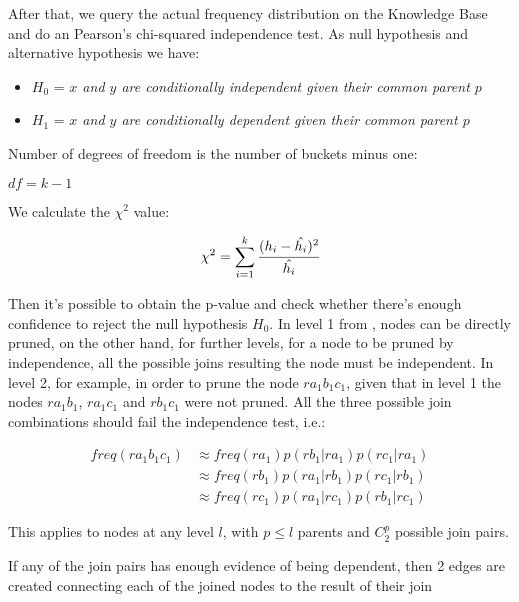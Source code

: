 After that, we query the actual frequency distribution on the Knowledge Base and do an Pearson's chi-squared
independence test. As null hypothesis and alternative hypothesis we have:

\begin{itemize}
 \item $H_0$ = \emph{$x$ and $y$ are conditionally independent given their common parent $p$}
 \item $H_1$ = \emph{$x$ and $y$ are conditionally dependent given their common parent $p$} 
\end{itemize}

  

Number of degrees of freedom is the number of buckets minus one:

\begin{center}
 $df=k-1$
\end{center}

We calculate the $\chi^2$ value:

\begin{equation}
 \chi^2=\sum_{i=1}^{k} \cfrac{(h_i - \hat{h_i})^2}{\hat{h_i}}
\end{equation}

\cite{Jaroszewicz02pruningredundant}

Then it's possible to obtain the p-value and check whether there's enough confidence to reject the null hypothesis
$H_0$. In level 1 from \graphname, nodes can be directly pruned, on the other hand, for further levels, for a node to be
pruned by independence, all the possible joins resulting the node must be independent. In level 2, for example, in order
to prune the node $r a_1 b_1 c_1$, given that in level 1 the nodes $r a_1 b_1$, $r a_1 c_1$ and $r b_1 c_1$ were not
pruned. All the three possible join combinations should fail the independence test, i.e.:

\begin{equation}
\begin{split} 
  freq(r a_1 b_1 c_1) &\approx freq(r a_1)p (r b_1|r a_1) p(r c_1|r a_1) \\ 
  &\approx  freq(r b_1) p(r a_1|r b_1) p(r c_1|r b_1) \\ 
  &\approx  freq(r c_1) p(r a_1|r c_1) p(r b_1|r c_1)  
\end{split}
\end{equation}

This applies to nodes at any level $l$, with $p \leq l$ parents and $C_{2}^{p}$ possible join pairs.

If any of the join pairs has enough evidence of being dependent, then 2 edges are created connecting each of the joined
nodes to the result of their join

